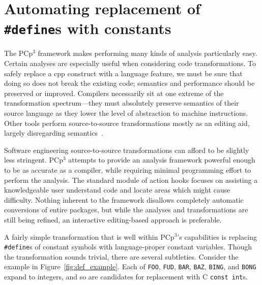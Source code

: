 \documentclass{article}
\newcommand{\pcp}{\mbox{\textsf{PCp}$^3$}}
\newcommand{\Cpp}{\mbox{\textsf{cpp}}}
\newcommand{\C}{\mbox{\textsf{C}}}
\newcommand{\ppd}[1]{\texttt{\##1}}
\newcommand{\figref}[1]{Figure~\ref{#1}}
\begin{document}





\section{Automating replacement of \ppd{define}s with constants}
\label{sec:xform}

The \pcp{} framework makes performing many kinds of analysis
particularly easy.  Certain analyses are especially useful when
considering code transformations.  To safely replace a \Cpp{}
construct with a language feature, we must be sure that doing so does
not break the existing code;  semantics and performance should be
preserved or improved.  Compilers necessarily sit at one extreme of the
transformation spectrum---they must absolutely preserve semantics of
their source language as they lower the level of abstraction to machine
instructions.  Other tools perform source-to-source transformations
mostly as an editing aid, largely disregarding semantics~\cite{C2J,C2JPP}.

Software engineering source-to-source transformations can afford to be
slightly less stringent.  \pcp{} attempts to provide an analysis
framework powerful enough to be as accurate as a compiler, while
requiring minimal programming effort to perform the analysis.  The
standard module of action hooks focuses on assisting a knowledgeable
user understand code and locate areas which might cause difficulty.
Nothing inherent to the framework disallows completely automatic
conversions of entire packages, but while the analyses and
transformations are still being refined, an interactive editing-based
approach is preferable.

A fairly simple transformation that is well within \pcp{}'s capabilities
is replacing \ppd{define}s of constant symbols with language-proper
constant variables.  Though the transformation sounds trivial, there are
several subtleties.  Consider the example in
\figref{fig:def_example}.  Each of \texttt{FOO}, \texttt{FUD},
\texttt{BAR}, \texttt{BAZ}, \texttt{BING}, and \texttt{BONG} expand to
integers, and so are candidates for replacement with \C{} \texttt{const
  int}s.
\end{document}
